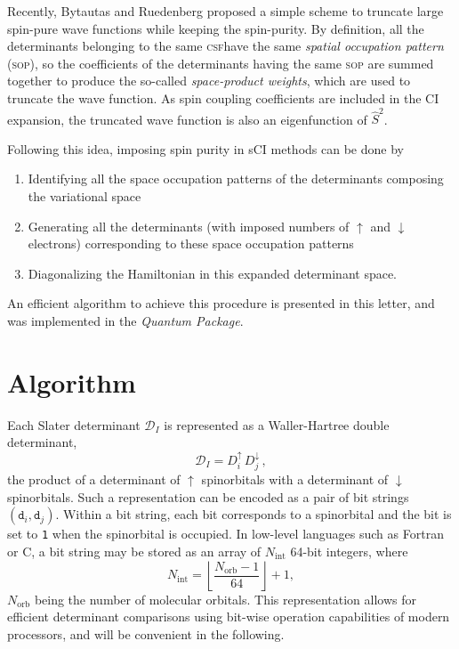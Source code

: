 \documentclass[aip,jcp,reprint,showkeys]{revtex4-1}
\newcommand{\stwo}{\hat{S}^2}
\newcommand{\md}{\mathtt{d}}
\newcommand{\mD}{\mathcal{D}}
\newcommand{\up}{\uparrow}
\newcommand{\dn}{\downarrow}
\newcommand{\Nint}{{N_\text{int}}}
\newcommand{\Norb}{{N_\text{orb}}}
\newcommand{\one}{{\texttt{1}}}
\newcommand{\sop}{\textsc{sop}}
\newcommand{\csf}{\textsc{csf}}
\begin{document}
Recently, Bytautas and Ruedenberg proposed a simple scheme to truncate large
spin-pure wave functions while keeping the spin-purity.\cite{Bytautas_2007}
By definition, all the determinants belonging to the same \csf have the same
\emph{spatial occupation pattern} (\sop), so the
coefficients of the determinants having the same {\sop}
are summed together to produce the so-called \emph{space-product
weights}, which are used to truncate the wave function. As spin coupling
coefficients are included in the CI expansion, the truncated wave function is
also an eigenfunction of $\stwo$.

Following this idea, imposing spin purity in sCI methods can be done by 
\begin{enumerate}
\item Identifying all the space occupation patterns of the determinants composing
      the variational space
\item Generating all the determinants (with imposed numbers of $\up$ and
      $\dn$ electrons) corresponding to these space occupation patterns
\item Diagonalizing the Hamiltonian in this expanded determinant space.
\end{enumerate}
An efficient algorithm to achieve this procedure is presented in this letter,
and was implemented in the \emph{Quantum Package}.\cite{qp}

\section{Algorithm}

Each Slater determinant $\mD_I$ is represented as a Waller-Hartree double
determinant,\cite{Pauncz_1989}
\begin{equation}
 \label{eq:di}
 \mD_I = D_i^\up \, D_j^\dn\, ,
\end{equation}
the product of a determinant of
$\up$ spinorbitals with a determinant of $\dn$ spinorbitals.
Such a representation can be encoded as a pair of bit strings $(\md_i,\md_j)$.
Within a bit string,
each bit corresponds to a spinorbital and the bit is set to \one{} when the
spinorbital is occupied. In low-level languages such as Fortran or C, a bit
string may be stored as an array of $\Nint$ 64-bit integers, where 
\begin{equation}
  \Nint = \left \lfloor \frac{\Norb-1}{64} \right \rfloor + 1,
\end{equation}
$\Norb$ being the number of molecular orbitals.
This representation
allows for efficient determinant comparisons using bit-wise operation 
capabilities of modern processors,\cite{Scemama_2013} and will be convenient
in the following.
\end{document}
